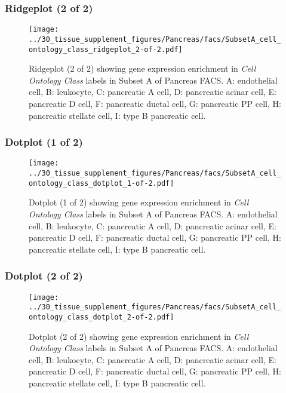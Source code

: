 \clearpage

\subsubsection{Ridgeplot (2 of 2)}
\begin{figure}[h]
\centering
\texttt{[image: ../30\_tissue\_supplement\_figures/Pancreas/facs/SubsetA\_cell\_ontology\_class\_ridgeplot\_2-of-2.pdf]}

\caption{ Ridgeplot (2 of 2)  showing gene expression enrichment in \emph{Cell Ontology Class} labels in Subset A of Pancreas FACS. A: endothelial cell, B: leukocyte, C: pancreatic A cell, D: pancreatic acinar cell, E: pancreatic D cell, F: pancreatic ductal cell, G: pancreatic PP cell, H: pancreatic stellate cell, I: type B pancreatic cell.}
\end{figure}


\clearpage

\subsubsection{Dotplot (1 of 2)}
\begin{figure}[h]
\centering
\texttt{[image: ../30\_tissue\_supplement\_figures/Pancreas/facs/SubsetA\_cell\_ontology\_class\_dotplot\_1-of-2.pdf]}

\caption{ Dotplot (1 of 2)  showing gene expression enrichment in \emph{Cell Ontology Class} labels in Subset A of Pancreas FACS. A: endothelial cell, B: leukocyte, C: pancreatic A cell, D: pancreatic acinar cell, E: pancreatic D cell, F: pancreatic ductal cell, G: pancreatic PP cell, H: pancreatic stellate cell, I: type B pancreatic cell.}
\end{figure}


\clearpage

\subsubsection{Dotplot (2 of 2)}
\begin{figure}[h]
\centering
\texttt{[image: ../30\_tissue\_supplement\_figures/Pancreas/facs/SubsetA\_cell\_ontology\_class\_dotplot\_2-of-2.pdf]}

\caption{ Dotplot (2 of 2)  showing gene expression enrichment in \emph{Cell Ontology Class} labels in Subset A of Pancreas FACS. A: endothelial cell, B: leukocyte, C: pancreatic A cell, D: pancreatic acinar cell, E: pancreatic D cell, F: pancreatic ductal cell, G: pancreatic PP cell, H: pancreatic stellate cell, I: type B pancreatic cell.}
\end{figure}


